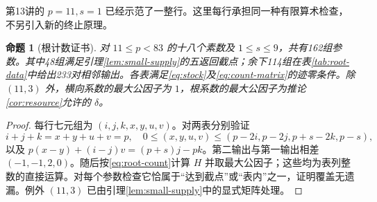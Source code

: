 \documentclass[11pt,a4paper,oneside,openany]{book}
\newtheorem{proposition}[theorem]{命题}
\theoremstyle{definition}
\numberwithin{equation}{chapter}
\begin{document}
第13讲的 $p=11,s=1$ 已经示范了一整行。这里每行承担同一种有限算术检查，不另引入新的终止原理。
\begin{proposition}[根计数证书]\label{prop:root-certificate}
对 $11\le p<83$ 的十八个素数及 $1\le s\le9$，共有162组参数。其中48组满足引理\ref{lem:small-supply}的五返回截点；余下114组在表\ref{tab:root-data}中给出233对相邻输出。各表满足\eqref{eq:stock}及\eqref{eq:count-matrix}的迹零条件。除 $(11,3)$ 外，横向系数的最大公因子为 $1$，根系数的最大公因子为推论\ref{cor:resource}允许的 $\delta$。
\end{proposition}
\begin{proof}
每行七元组为 $(i,j,k,x,y,u,v)$。对两表分别验证
\[
i+j+k=x+y+u+v=p,\quad
0\le(x,y,u,v)\le(p-2i,p-2j,p+s-2k,p-s),
\]
以及 $p(x-y)+(i-j)v=(p+s)j-pk$。第二输出与第一输出相差 $(-1,-1,2,0)$。随后按\eqref{eq:root-count}计算 $H$ 并取最大公因子；这些均为表列整数的直接运算。对每个参数检查它恰属于“达到截点”或“表内”之一，证明覆盖无遗漏。例外 $(11,3)$ 已由引理\ref{lem:small-supply}中的显式矩阵处理。
\end{proof}
\begingroup\small
\end{document}
